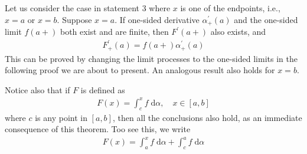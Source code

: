 \documentclass[thmcnt=section, 12pt]{my-elegantbook}
\begin{document}
\begin{note}
    Let us consider the case in statement 3
    where $x$ is one of the endpoints,
    i.e., $x = a$ or $x = b$.
    Suppose $x = a$.
    If one-sided derivative $\alpha^\prime_{+}(a)$
    and the one-sided limit $f(a+)$ both exist and are finite,
    then $F^\prime(a+)$ also exists, and
    \begin{align*}
        F^\prime_{+}(a) = f(a+) \alpha^\prime_{+}(a)
    \end{align*}
    This can be proved by changing the limit processes
    to the one-sided limits in the following proof
    we are about to present.
    An analogous result also holds for $x = b$.

    Notice also that if $F$ is defined as
    \begin{align*}
        F(x) = \int_c^x f \; \mathrm{d} \alpha,
        \quad x \in [a, b]
    \end{align*}
    where $c$ is any point in $[a, b]$,
    then all the conclusions also hold,
    as an immediate consequence of this theorem.
    Too see this, we write
    \begin{align*}
        F(x) = \int_a^x f \; \mathrm{d} \alpha
        + \int_c^a f \; \mathrm{d} \alpha
    \end{align*}
\end{note}
\end{document}
